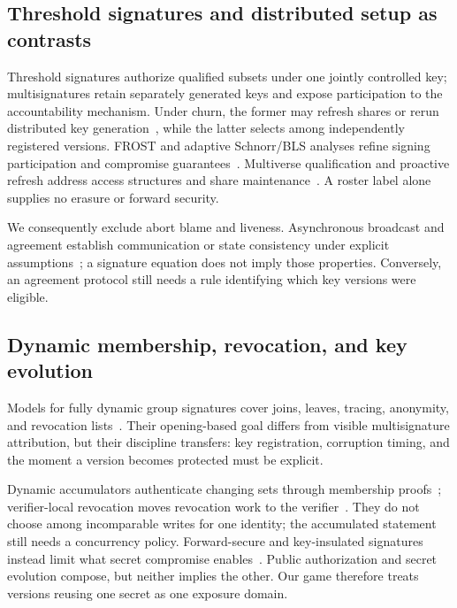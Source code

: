 \documentclass[11pt]{article}
\theoremstyle{definition}
\begin{document}
\subsection{Threshold signatures and distributed setup as contrasts}
Threshold signatures authorize qualified subsets under one jointly controlled key; multisignatures retain separately generated keys and expose participation to the accountability mechanism.  Under churn, the former may refresh shares or rerun distributed key generation~\cite{gennaro1999dkg,canny2004dkg,groth2021dkg}, while the latter selects among independently registered versions.  FROST and adaptive Schnorr/BLS analyses refine signing participation and compromise guarantees~\cite{komlo2021frost,crites2023adaptive,bacho2022threshold}. Multiverse qualification and proactive refresh address access structures and share maintenance~\cite{baird2023multiverse,boneh2022proactive}.  A roster label alone supplies no erasure or forward security.

We consequently exclude abort blame and liveness.  Asynchronous broadcast and agreement establish communication or state consistency under explicit assumptions~\cite{cachin2001secure,cachin2000constantinople,reiter1996secure}; a signature equation does not imply those properties.  Conversely, an agreement protocol still needs a rule identifying which key versions were eligible.

\subsection{Dynamic membership, revocation, and key evolution}
Models for fully dynamic group signatures cover joins, leaves, tracing, anonymity, and revocation lists~\cite{bootle2020dynamic}.  Their opening-based goal differs from visible multisignature attribution, but their discipline transfers: key registration, corruption timing, and the moment a version becomes protected must be explicit.

Dynamic accumulators authenticate changing sets through membership proofs~\cite{camenisch2002accumulator,nguyen2005accumulator}; verifier-local revocation moves revocation work to the verifier~\cite{boneh2004vlr}.  They do not choose among incomparable writes for one identity; the accumulated statement still needs a concurrency policy.  Forward-secure and key-insulated signatures instead limit what secret compromise enables~\cite{bellare1999forward,itkis2001forward,dodis2002keyinsulated}.  Public authorization and secret evolution compose, but neither implies the other.  Our game therefore treats versions reusing one secret as one exposure domain.
\end{document}
